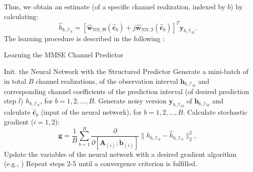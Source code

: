 \documentclass[12pt, draftclsnofoot, onecolumn]{IEEEtran}
\begin{document}
Thus, we obtain an estimate (of a specific channel realization, indexed by $b$) by calculating: 
\begin{equation}
\hat{h}_{b,\mathcal{I}_N} = [\hat{\mathbf{w}}_{\text{NN},\Re}(\hat{\mathbf{c}}_b) + j\hat{\mathbf{w}}_{\text{NN},\Im}(\hat{\mathbf{c}}_b)]^T\mathbf{y}_{b,\mathcal{I}_M}.    
\end{equation}
The learning procedure is described in the following \cite{turan2019learning}:
\begin{algorithm}[H]
\caption{Learning the MMSE Channel Predictor}
\begin{algorithmic}[1]
\STATE Init. the Neural Network with the Structured Predictor
\STATE Generate a mini-batch of in total $B$ channel realizations, of the observation interval $\mathbf{h}_{b,\mathcal{I}_M}$ and corresponding channel coefficients of the prediction interval (of desired prediction step $l$) $h_{b,\mathcal{I}_N}$, for $b = 1,2,\dots,B$.
\STATE Generate noisy version $\mathbf{y}_{b,\mathcal{I}_M}$ of $\mathbf{h}_{b,\mathcal{I}_M}$ and calculate $\mathbf{\hat{c}}_b$ (input of the neural network), for $b = 1,2,\dots,B$.
\STATE Calculate stochastic gradient ($i = 1,2$):
\begin{equation*}
    \mathbf{g} = \dfrac{1}{B} \sum_{b=1}^{B} \dfrac{\partial}{\partial[\mathbf{A}_{(i)};\mathbf{b}_{(i)}] } \| h_{b,\mathcal{I}_N} -  \hat{h}_{b,\mathcal{I}_N}\|_2^2,
\end{equation*}
\STATE Update the variables of the neural network with a desired gradient algorithm (e.g., \cite{Kingma})
\STATE Repeat steps 2-5 until a convergence criterion is fulfilled.
\end{algorithmic}
\end{algorithm}
\end{document}
